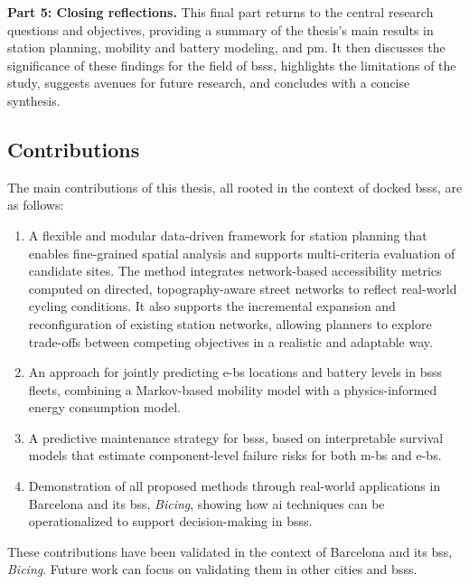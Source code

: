 \textbf{Part 5: Closing reflections.}
This final part returns to the central research questions and objectives, providing a summary of the thesis’s main results in station planning, mobility and battery modeling, and \ac{pm}. It then discusses the significance of these findings for the field of \acp{bss}, highlights the limitations of the study, suggests avenues for future research, and concludes with a concise synthesis.


\subsection{Contributions}

The main contributions of this thesis, all rooted in the context of docked \acp{bss}, are as follows:

\begin{enumerate}  
    \item A flexible and modular data-driven framework for station planning that enables fine-grained spatial analysis and supports multi-criteria evaluation of candidate sites. The method integrates network-based accessibility metrics computed on directed, topography-aware street networks to reflect real-world cycling conditions. It also supports the incremental expansion and reconfiguration of existing station networks, allowing planners to explore trade-offs between competing objectives in a realistic and adaptable way.

    \item An approach for jointly predicting \acp{e-b} locations and battery levels in \acp{bss} fleets, combining a Markov-based mobility model with a physics-informed energy consumption model.

    \item A predictive maintenance strategy for \acp{bss}, based on interpretable survival models that estimate component-level failure risks for both \acp{m-b} and \acp{e-b}.

    \item Demonstration of all proposed methods through real-world applications in Barcelona and its \ac{bss}, \textit{Bicing}, showing how \ac{ai} techniques can be operationalized to support decision-making in \acp{bss}.

\end{enumerate}

These contributions have been validated in the context of Barcelona and its \ac{bss}, \textit{Bicing}. Future work can focus on validating them in other cities and \acp{bss}.

